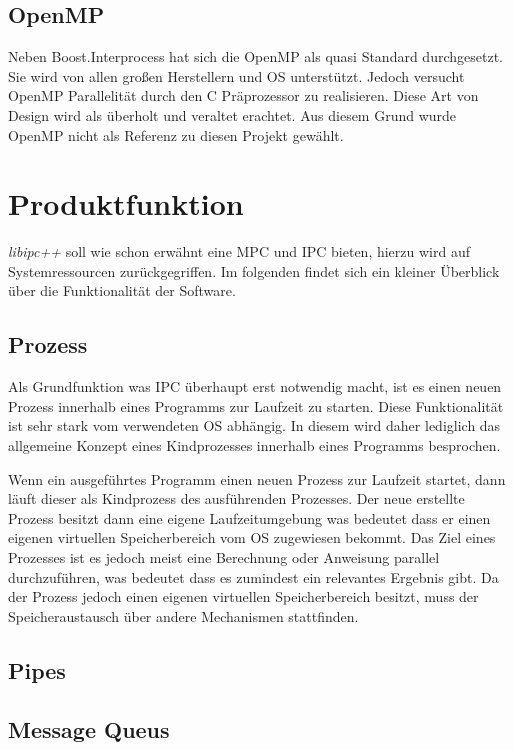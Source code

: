 \documentclass[a4paper]{book}
\begin{document}
\subsection{OpenMP}
Neben Boost.Interprocess hat sich die OpenMP als quasi Standard durchgesetzt. Sie wird von allen großen Herstellern und OS unterstützt. Jedoch versucht OpenMP Parallelität durch den C Präprozessor zu realisieren. Diese Art von Design wird als überholt und veraltet erachtet. Aus diesem Grund wurde OpenMP nicht als Referenz zu diesen Projekt gewählt.

\section{Produktfunktion}
\textit{libipc++} soll wie schon erwähnt eine MPC und IPC bieten, hierzu wird auf Systemressourcen zurückgegriffen. Im folgenden findet sich ein kleiner Überblick über die Funktionalität der Software.

\subsection{Prozess}
Als Grundfunktion was IPC überhaupt erst notwendig macht, ist es einen neuen Prozess innerhalb eines Programms zur Laufzeit zu starten. Diese Funktionalität ist sehr stark vom verwendeten OS abhängig. In diesem wird daher lediglich das allgemeine Konzept eines Kindprozesses innerhalb eines Programms besprochen.\newline

\noindent Wenn ein ausgeführtes Programm einen neuen Prozess zur Laufzeit startet, dann läuft dieser als Kindprozess des ausführenden Prozesses. Der neue erstellte Prozess besitzt dann eine eigene Laufzeitumgebung was bedeutet dass er einen eigenen virtuellen Speicherbereich vom OS zugewiesen bekommt. Das Ziel eines Prozesses ist es jedoch meist eine Berechnung oder Anweisung parallel durchzuführen, was bedeutet dass es zumindest ein relevantes Ergebnis gibt. Da der Prozess jedoch einen eigenen virtuellen Speicherbereich besitzt, muss der Speicheraustausch über andere Mechanismen stattfinden.

\subsection{Pipes}
\blindtext

\subsection{Message Queus}
\blindtext
\end{document}
